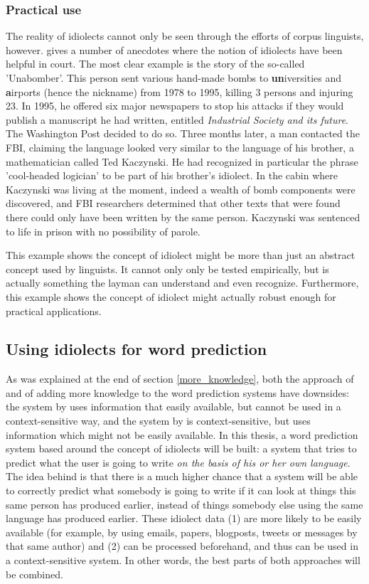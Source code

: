 \documentclass[12pt]{article}
\begin{document}
\subsubsection{Practical use}
The reality of idiolects cannot only be seen through the efforts of corpus linguists, however.  gives a number of anecdotes where the notion of idiolects have been helpful in court. The most clear example is the story of the so-called 'Unabomber'. This person sent various hand-made bombs to \textbf{un}iversities and \textbf{a}irports (hence the nickname) from 1978 to 1995, killing 3 persons and injuring 23. In 1995, he offered six major newspapers to stop his attacks if they would publish a manuscript he had written, entitled \emph{Industrial Society and its future}. The Washington Post decided to do so. Three months later, a man contacted the FBI, claiming the language looked very similar to the language of his brother, a mathematician called Ted Kaczynski. He had recognized in particular the phrase 'cool-headed logician' to be part of his brother's idiolect. In the cabin where Kaczynski was living at the moment, indeed a wealth of bomb components were discovered, and FBI researchers determined that other texts that were found there could only have been written by the same person. Kaczynski was sentenced to life in prison with no possibility of parole. 

This example shows the concept of idiolect might be more than just an abstract concept used by linguists. It cannot only only be tested empirically, but is actually something the layman can understand and even recognize. Furthermore, this example shows the concept of idiolect might actually robust enough for practical applications.

\subsection{Using idiolects for word prediction} \label{linking}
As was explained at the end of section \ref{more_knowledge}, both the approach of  and  of adding more knowledge to the word prediction systems have downsides: the system by \citeauthor{vandenbosch11} uses information that easily available, but cannot be used in a context-sensitive way, and the system by  is context-sensitive, but uses information which might not be easily available. In this thesis, a word prediction system based around the concept of idiolects will be built: a system that tries to predict what the user is going to write \emph{on the basis of his  or her own language}. The idea behind is that there is a much higher chance that a system will be able to correctly predict what somebody is going to write if it can look at things this same person has produced earlier, instead of things somebody else using the same language has produced earlier. These idiolect data (1) are more likely to be easily available (for example, by using emails, papers, blogposts, tweets or messages by that same author) and (2) can be processed beforehand, and thus can be used in a context-sensitive system. In other words, the best parts of both approaches will be combined.
\end{document}
